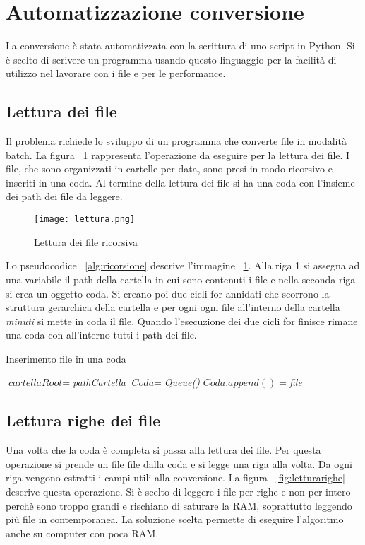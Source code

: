 \documentclass[../main.tex]{subfiles}
\begin{document}
\section{Automatizzazione conversione}
La conversione è stata automatizzata con la scrittura di uno script in Python. Si è scelto di scrivere un programma usando questo linguaggio per la facilità di utilizzo nel lavorare con i file e per le performance.

\subsection{Lettura dei file}
Il problema richiede lo sviluppo di un programma che converte file in modalità batch.
La figura ~\ref{fig:lettura} rappresenta l'operazione da eseguire per la lettura dei file. I file, che sono organizzati in cartelle per data, sono presi in modo ricorsivo e inseriti in una coda. Al termine della lettura dei file si ha una coda con l'insieme dei path dei file da leggere.
\begin{figure}[H]
				\centering
\texttt{[image: lettura.png]}
				\caption{Lettura dei file ricorsiva}
				\label{fig:lettura}
\end{figure}

Lo pseudocodice ~\ref{alg:ricorsione} descrive l'immagine ~\ref{fig:lettura}. Alla riga 1 si assegna ad una variabile il path della cartella in cui sono contenuti i file e nella seconda riga si crea un oggetto coda. Si creano poi due cicli for annidati che scorrono la struttura gerarchica della cartella e per ogni ogni file all'interno della cartella \textit{minuti} si mette in coda il file. Quando l'esecuzione dei due cicli for finisce rimane una coda con all'interno tutti i path dei file.
\begin{algorithm}
\caption{Inserimento file in una coda}
				\label{alg:ricorsione}
\begin{algorithmic}[1]
				\State $\textit{cartellaRoot} =  $\textit{pathCartella}
				\State $\textit{Coda} = $\textit{Queue()}
						\State $\textit{Coda}.append() = $\textit{file}
						\EndFor
				\EndFor
\end{algorithmic}
\end{algorithm}

\subsection{Lettura righe dei file} 
Una volta che la coda è completa si passa alla lettura dei file. Per questa operazione si prende un file file dalla coda e si legge una riga alla volta. Da ogni riga vengono estratti i campi utili alla conversione.
La figura ~\ref{fig:letturarighe} descrive questa operazione. Si è scelto di leggere i file per righe e non per intero perchè sono troppo grandi e rischiano di saturare la RAM, soprattutto leggendo più file in contemporanea. La soluzione scelta permette di eseguire l'algoritmo anche su computer con poca RAM.
\end{document}
